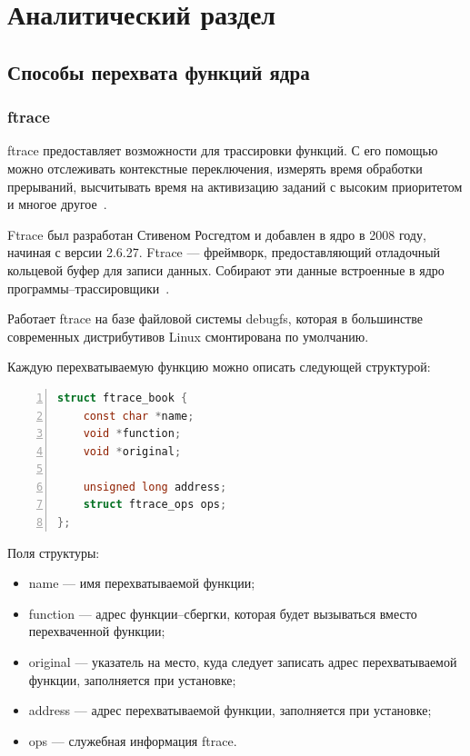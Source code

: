 \chapter{Аналитический раздел}

\section{Способы перехвата функций ядра}

\subsection{ftrace}

ftrace предоставляет возможности для трассировки функций. С его помощью можно отслеживать контекстные переключения, измерять время обработки прерываний, высчитывать время на активизацию заданий с высоким приоритетом и многое другое~\cite{stevens}.

Ftrace был разработан Стивеном Росгедтом и добавлен в ядро в 2008 году, начиная с версии 2.6.27. Ftrace — фреймворк, предоставляющий отладочный кольцевой буфер для записи данных. Собирают эти данные встроенные в ядро программы–трассировщики~\cite{stevens}.

Работает ftrace на базе файловой системы debugfs, которая в большинстве современных дистрибутивов Linux смонтирована по умолчанию.

Каждую перехватываемую функцию можно описать следующей структурой:

\begin{lstlisting}[language=C, frame=single, numbers=left, caption={Структура ftrace\_book}]
struct ftrace_book {
	const char *name;
	void *function;
	void *original;
	
	unsigned long address;
	struct ftrace_ops ops;
};
\end{lstlisting}


Поля структуры:
\begin{itemize}
	\item[---] name — имя перехватываемой функции;
	\item[---] function — адрес функции–сбергки, которая будет вызываться вместо перехваченной функции;
	\item[---] original — указатель на место, куда следует записать адрес перехватываемой функции, заполняется при установке;
	\item[---] address — адрес перехватываемой функции, заполняется при установке;
	\item[---] ops — служебная информация ftrace.
\end{itemize}

